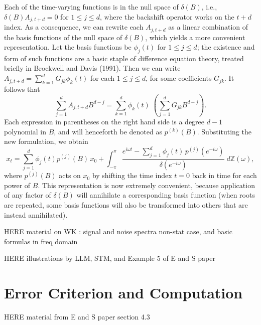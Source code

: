 \documentclass[a4paper]{book}
\def\ZZ{\mathbb Z}
\begin{document}
 Each of the time-varying functions is in the null
 space of $\delta (B)$, i.e., $\delta (B) A_{j, t+d} = 0$ for $1 \leq
 j \leq d$, where the backshift operator works on the $t+d$ index.
 As a consequence, we can rewrite each $A_{j,t+d}$ as a linear
 combination of the basis functions of the null space of $\delta
 (B)$, which yields a more convenient representation.  Let the basis
 functions be $\phi_j (t) $ for $1 \leq j \leq d$; the existence and
 form of such functions are a basic staple of difference equation
 theory, treated briefly in Brockwell and Davis (1991).  Then we can
 write $A_{j,t+d} = \sum_{k=1}^d G_{jk} \phi_k (t)$ for each $1 \leq
 j \leq d$, for some coefficients $G_{jk}$.  It follows that
\[
 \sum_{j=1}^d A_{j,t+d} B^{d-j} = \sum_{k=1}^d \phi_k (t)  \; \left(
 \sum_{j=1}^d G_{jk} B^{d-j} \right).
\]
 Each expression in parentheses on the right hand side is a degree
 $d-1$ polynomial in $B$, and will henceforth be denoted as $p^{(k)}
 (B)$.   Substituting the new formulation, we obtain
\[
 x_t = \sum_{j=1}^d \phi_j (t) p^{(j)} (B) \, x_{0} + \int_{-\pi}^{\pi}
 \frac{ e^{i \omega t} - \sum_{j=1}^d \phi_j (t) \, p^{(j)} ( e^{-i \omega
 } )}{ \delta (e^{-i \omega}) } \; d \ZZ (\omega),
\]
 where $p^{(j)} (B)$ acts on $x_0$ by shifting the time index $t=0$
 back in time for each power of $B$.  This representation is now
 extremely convenient, because application of any factor of
 $\delta(B)$ will annihilate a corresponding basis function (when
 roots are repeated, some basis functions will also be transformed
 into others that are instead annihilated). 

   
  HERE material on WK : signal and noise spectra non-stat case, and basic formulas
    in freq domain
    
  HERE illustrations by LLM, STM, and Example 5 of E and S paper
  
  

\section{Error Criterion and Computation}
\label{sec:mdfa-nonstat}

HERE material from E and S paper section 4.3
\end{document}
